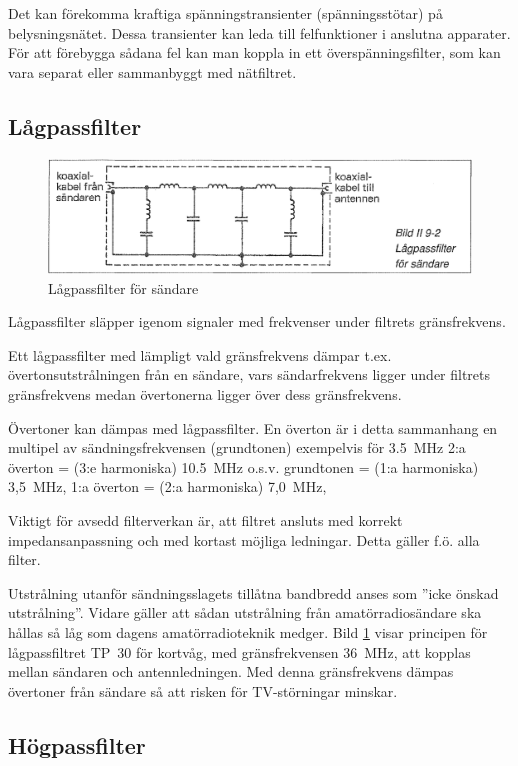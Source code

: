 Det kan förekomma kraftiga spänningstransienter (spänningsstötar) på
belysningsnätet. Dessa transienter kan leda till felfunktioner i anslutna
apparater. För att förebygga sådana fel kan man koppla in ett
överspänningsfilter, som kan vara separat eller sammanbyggt med nätfiltret.

\subsection{Lågpassfilter}

\begin{figure}
  \includegraphics[width=\textwidth]{images/bild_2_9-02}
  \caption{Lågpassfilter för sändare}
  \label{fig:bildII9-2}
\end{figure}

Lågpassfilter släpper igenom signaler med frekvenser under filtrets
gränsfrekvens.

Ett lågpassfilter med lämpligt vald gränsfrekvens dämpar t.ex.
övertonsutstrålningen från en sändare, vars sändarfrekvens ligger under filtrets
gränsfrekvens medan övertonerna ligger över dess gränsfrekvens.

Övertoner kan dämpas med lågpassfilter. En överton är i detta sammanhang en
multipel av sändningsfrekvensen (grundtonen) exempelvis för 3.5~MHz
2:a överton = (3:e harmoniska) 10.5~MHz o.s.v.
grundtonen = (1:a harmoniska) 3,5~MHz, 1:a överton = (2:a harmoniska) 7,0~MHz,

Viktigt för avsedd filterverkan är, att filtret ansluts med korrekt
impedansanpassning och med kortast möjliga ledningar. Detta gäller
f.ö. alla filter.

Utstrålning utanför sändningsslagets tillåtna bandbredd anses som
''icke önskad utstrålning''. Vidare gäller att sådan utstrålning från
amatörradiosändare ska hållas så låg som dagens amatörradioteknik medger.
Bild \ref{fig:bildII9-2} visar principen för lågpassfiltret TP~30 för kortvåg,
med gränsfrekvensen 36~MHz, att kopplas mellan sändaren och antennledningen.
Med denna gränsfrekvens dämpas övertoner från sändare så att risken för
TV-störningar minskar.

\subsection{Högpassfilter}

